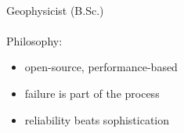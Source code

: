 \documentclass{article}
\begin{document}
\vspace{-0.5cm}
\begin{mdframed}[backgroundcolor=anti-flashwhite]
	\begin{minipage}[t]{0.4\textwidth}
	{\fontsize{30pt}{62pt}\color{gray} }\\
    {\fontsize{14pt}{24pt}\color{pblue} \selectfont Geophysicist \color{lightgray} (B.Sc.)}\\\\
    Philosophy:
    \begin{itemize}
    \item open-source, performance-based
    \item failure is part of the process
    \item reliability beats sophistication
    \end{itemize}
	\end{minipage}
	\hfill
	\vrule
	\hfill
	\begin{minipage}[t]{0.2\textwidth}
	\vspace{0cm}
\end{minipage}
\end{mdframed}
\end{document}
